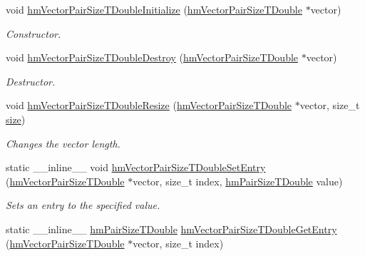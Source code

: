 \begin{DoxyCompactItemize}
\item 
void \hyperlink{structhm_vector_pair_size_t_double_adc7db0d27a3303f101280d5cca849544}{hm\-Vector\-Pair\-Size\-T\-Double\-Initialize} (\hyperlink{structhm_vector_pair_size_t_double}{hm\-Vector\-Pair\-Size\-T\-Double} $\ast$vector)
\begin{DoxyCompactList}\small\item\em Constructor. \end{DoxyCompactList}\item 
void \hyperlink{structhm_vector_pair_size_t_double_aa43cd0f2f6952dc98be353c0d78015ba}{hm\-Vector\-Pair\-Size\-T\-Double\-Destroy} (\hyperlink{structhm_vector_pair_size_t_double}{hm\-Vector\-Pair\-Size\-T\-Double} $\ast$vector)
\begin{DoxyCompactList}\small\item\em Destructor. \end{DoxyCompactList}\item 
void \hyperlink{structhm_vector_pair_size_t_double_a2f6cb58029369bad2a0b4f9d3792e77a}{hm\-Vector\-Pair\-Size\-T\-Double\-Resize} (\hyperlink{structhm_vector_pair_size_t_double}{hm\-Vector\-Pair\-Size\-T\-Double} $\ast$vector, size\-\_\-t \hyperlink{structhm_vector_pair_size_t_double_a854352f53b148adc24983a58a1866d66}{size})
\begin{DoxyCompactList}\small\item\em Changes the vector length. \end{DoxyCompactList}\item 
static \-\_\-\-\_\-inline\-\_\-\-\_\- void \hyperlink{structhm_vector_pair_size_t_double_a79fdaf4a031f099789346dd86f863212}{hm\-Vector\-Pair\-Size\-T\-Double\-Set\-Entry} (\hyperlink{structhm_vector_pair_size_t_double}{hm\-Vector\-Pair\-Size\-T\-Double} $\ast$vector, size\-\_\-t index, \hyperlink{structhm_pair_size_t_double}{hm\-Pair\-Size\-T\-Double} value)
\begin{DoxyCompactList}\small\item\em Sets an entry to the specified value. \end{DoxyCompactList}\item 
static \-\_\-\-\_\-inline\-\_\-\-\_\- \hyperlink{structhm_pair_size_t_double}{hm\-Pair\-Size\-T\-Double} \hyperlink{structhm_vector_pair_size_t_double_ae394f23cd44b8276842573475b40b4fb}{hm\-Vector\-Pair\-Size\-T\-Double\-Get\-Entry} (\hyperlink{structhm_vector_pair_size_t_double}{hm\-Vector\-Pair\-Size\-T\-Double} $\ast$vector, size\-\_\-t index)

\end{DoxyCompactItemize}
